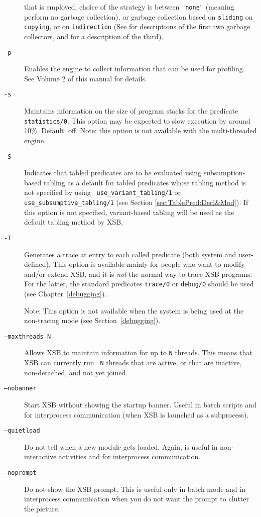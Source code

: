 \begin{description}
  that is employed; choice of the strategy is between {\tt "none"}
  (meaning perform no garbage collection), or garbage collection based
  on {\tt sliding} on {\tt copying}, or on {\tt indirection} (See
  \cite{CATmem@ISMM-98} for descriptions of the first two garbage
  collectors, and \cite{CaSC01} for a description of the third).
%
\item[{\tt -p}] Enables the engine to collect information that can be
  used for profiling.  See Volume 2 of this manual for details.
%
\item[{\tt -s}] Maintains information on the size of program stacks
  for the predicate {\tt statistics/0}.  This option may be expected
  to slow execution by around 10\%.  Default: off.  Note: this option
  is not available with the multi-threaded engine.
\item[{\tt -S}] Indicates that tabled predicates are to be evaluated
    using subsumption-based tabling as a default for tabled predicates
    whose tabling method is not specified by using {\tt
    use\_variant\_tabling/1} or {\tt use\_subsumptive\_tabling/1} (see
    Section \ref{sec:TablePred:Decl&Mod}).  If this option is not
    specified, variant-based tabling will be used as the default tabling
    method by XSB\@.
\item[{\tt -T}] Generates a trace at entry to each called predicate
    (both system and user-defined).  This option is available mainly
    for people who want to modify and/or extend XSB, and it is
    {\em not\/} the normal way to trace XSB programs.  For the
    latter, the standard predicates {\tt trace/0} or {\tt debug/0}
    should be used (see Chapter~\ref{debugging}).

    Note: This option is not available when the system is being used
    at the non-tracing mode (see Section~\ref{debugging}).
  \item[{\tt --maxthreads N}] Allows XSB to maintain information for
    up to {\tt N} threads.  This means that XSB can currently run {\tt
      N} threads that are active, or that are inactive, non-detached,
    and not yet joined.
  \item[{\tt --nobanner}] Start XSB without showing the startup banner.
    Useful in batch scripts and for interprocess communication (when XSB is
    launched as a subprocess).
  \item[{\tt --quietload}] Do not tell when a new module gets loaded. Again, is
    useful in non-interactive activities and for interprocess communication.
  \item[{\tt --noprompt}] Do not show the XSB prompt. This is useful only in batch
    mode and in interprocess communication when you do not want the prompt
    to clutter the picture.
\end{description}

